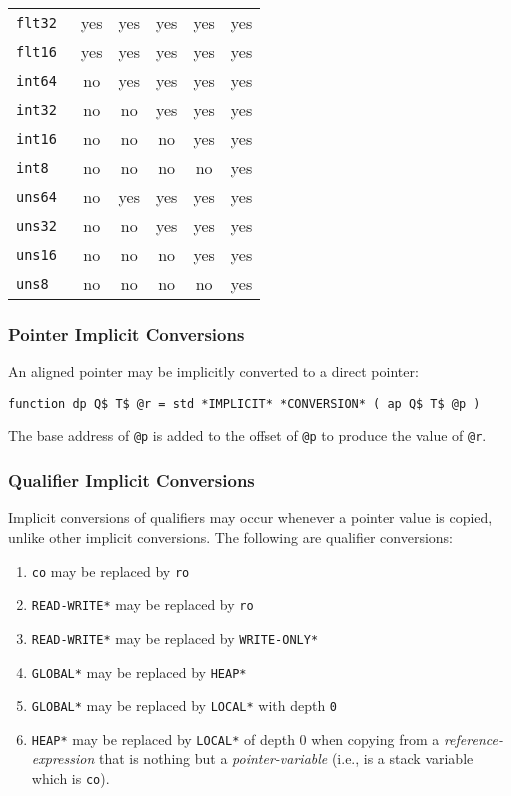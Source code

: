 \documentclass[12pt]{article}
\newenvironment{indpar}[1][0.3in]%
	{\begin{list}{}%
		     {\setlength{\itemsep}{0in}%
		      \setlength{\topsep}{0in}%
		      \setlength{\parsep}{1ex}%
		      \setlength{\labelwidth}{#1}%
		      \setlength{\leftmargin}{#1}%
		      \addtolength{\leftmargin}{\labelsep}}%
	 \item}%
	{\end{list}}
\begin{document}
\begin{center}
\begin{tabular}{l|c|c|c|c|c|}
\tt flt32 & yes & yes & yes & yes & yes \\
\tt flt16 & yes & yes & yes & yes & yes
\\\hline
\tt int64 & no & yes & yes & yes & yes \\
\tt int32 & no & no & yes & yes & yes \\
\tt int16 & no & no & no & yes & yes \\
\tt int8 & no & no & no & no & yes
\\\hline
\tt uns64 & no & yes & yes & yes & yes \\
\tt uns32 & no & no & yes & yes & yes \\
\tt uns16 & no & no & no & yes & yes \\
\tt uns8 & no & no & no & no & yes
\\\hline
\end{tabular}
\end{center}

\subsubsection{Pointer Implicit Conversions}
\label{POINTER-IMPLICIT-CONVERSIONS}

An aligned pointer may be implicitly converted to a direct pointer:

\begin{indpar}
{\tt function dp Q\$ T\$ @r = std *IMPLICIT* *CONVERSION* ( ap Q\$ T\$ @p )}
\begin{indpar}
The base address of {\tt @p} is added to the offset of {\tt @p} to
produce the value of {\tt @r}.
\end{indpar}
\end{indpar}

\subsubsection{Qualifier Implicit Conversions}
\label{QUALIFIER-IMPLICIT-CONVERSIONS}

Implicit conversions of qualifiers may occur whenever a pointer
value is copied, unlike other implicit conversions.
The following are qualifier conversions:
\begin{indpar}
\begin{enumerate}
\item {\tt co} may be replaced by {\tt ro}
\item {\tt *READ-WRITE*} may be replaced by {\tt ro}
\item {\tt *READ-WRITE*} may be replaced by {\tt *WRITE-ONLY*}
\item {\tt *GLOBAL*} may be replaced by {\tt *HEAP*}
\item {\tt *GLOBAL*} may be replaced by {\tt *LOCAL*} with depth {\tt 0}
\item {\tt *HEAP*} may be replaced by {\tt *LOCAL*} of depth 0 when copying
from a {\em reference-expression} that
is nothing but a {\em pointer-variable} (i.e., is a stack
variable which is {\tt co}).

\end{enumerate}
\end{indpar}
\end{document}
